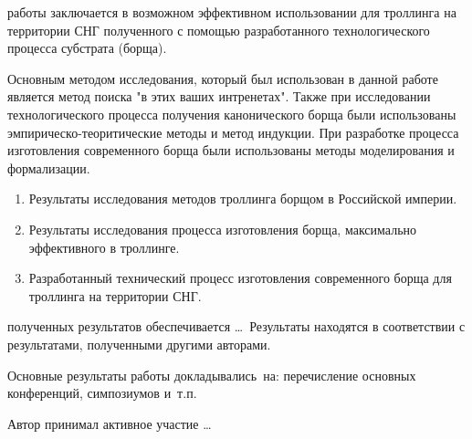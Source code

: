 {\influence} работы заключается в возможном эффективном использовании для троллинга на территории СНГ полученного с помощью разработанного технологического процесса субстрата (борща).

{\methods} Основным методом исследования, который был использован в данной работе является метод поиска "в этих ваших интренетах".  Также при исследовании технологического процесса получения канонического борща были использованы эмпирическо-теоритические методы и метод индукции. При разработке процесса изготовления современного борща были использованы методы моделирования и формализации.

{}
\begin{enumerate}
  \item Результаты исследования методов троллинга борщом в Российской империи.
  \item Результаты исследования процесса изготовления борща, максимально эффективного в троллинге.
  \item Разработанный технический процесс изготовления современного борща для троллинга на территории СНГ.
\end{enumerate}


{\reliability} полученных результатов обеспечивается \ldots \ Результаты находятся в соответствии с результатами, полученными другими авторами.


{\probation}
Основные результаты работы докладывались~на:
перечисление основных конференций, симпозиумов и~т.\:п.

{\contribution} Автор принимал активное участие \ldots


